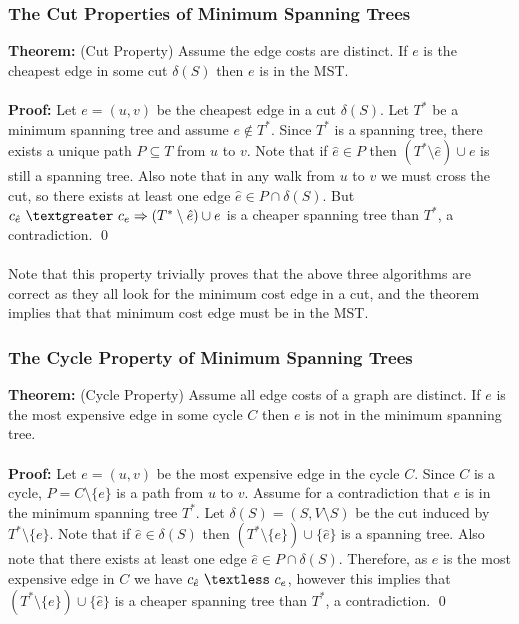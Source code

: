 \documentclass{article}
\newcommand{\lt}{\textless}
\newcommand{\gt}{\textgreater}
\newcommand{\imply}{\Rightarrow}
\newcommand{\de}{\delta}
\newcommand{\thm}{\textbf{Theorem: }}
\newcommand{\proo}{\textbf{Proof: }}
\newcommand{\sm}{\setminus}
\begin{document}
\subsubsection{The Cut Properties of Minimum Spanning Trees}
\thm (Cut Property) Assume the edge costs are distinct. If $e$ is the cheapest edge in some cut $\de(S)$ then $e$ is in the MST.\\\\
\proo Let $e = (u, v)$ be the cheapest edge in a cut $\de(S)$. Let $T^*$ be a minimum spanning tree and assume $e \notin T^*$. Since $T^*$ is a spanning tree, there exists a unique path $P \subseteq T$ from $u$ to $v$. Note that if $\hat{e} \in P$ then $(T^* \setminus \hat{e})\cup e$ is still a spanning tree. Also note that in any walk from $u$ to $v$ we must cross the cut, so there exists at least one edge $\hat{e} \in P \cap \de(S)$. But $c_{\hat{e}}\ \gt\ c_e \imply (T^* \setminus \hat{e}) \cup e$ is a cheaper spanning tree than $T^*$, a contradiction.
\qed\\\\
Note that this property trivially proves that the above three algorithms are correct as they all look for the minimum cost edge in a cut, and the theorem implies that that minimum cost edge must be in the MST.
\subsubsection{The Cycle Property of Minimum Spanning Trees}
\thm (Cycle Property) Assume all edge costs of a graph are distinct. If $e$ is the most expensive edge in some cycle $C$ then $e$ is not in the minimum spanning tree.\\\\
\proo Let $e =(u, v)$ be the most expensive edge in the cycle $C$. Since $C$ is a cycle, $P = C \setminus \{e\}$ is a path from $u$ to $v$. Assume for a contradiction that $e$ is in the minimum spanning tree $T^*$. Let $\de(S) = (S, V \setminus S)$ be the cut induced by $T^*\sm \{e\}$. Note that if $\hat{e} \in \de(S)$ then $(T^*\sm \{e\}) \cup \{\hat{e}\}$ is a spanning tree. Also note that there exists at least one edge $\hat{e} \in P \cap \de(S)$. Therefore, as $e$ is the most expensive edge in $C$ we have $c_{\hat{e}}\ \lt\ c_e$, however this implies that $(T^*\sm \{e\})\cup \{\hat{e}\}$ is a cheaper spanning tree than $T^*$, a contradiction.
\qed
\end{document}
